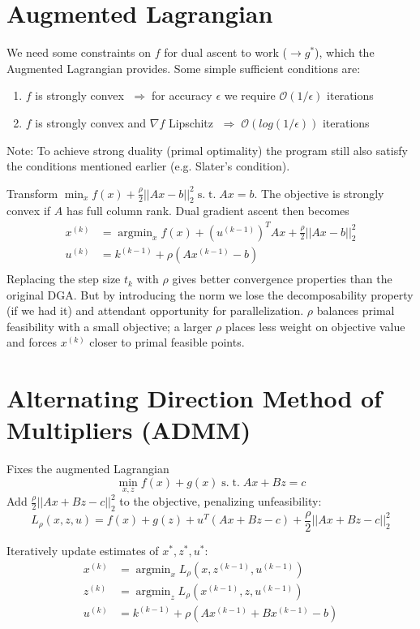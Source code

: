 \documentclass[10pt]{article}
\DeclareMathOperator*{\argmin}{argmin}
\renewcommand{\O}{\ensuremath{\mathcal{O}}}
\newcommand{\st}{\ensuremath{\;\mathrm{s.}\;\mathrm{t.}\;}}
\newcommand{\then}{\ensuremath{\;\Rightarrow\;}}
\begin{document}
\section{Augmented Lagrangian}
We need some constraints on $f$ for dual ascent to work ($\to g^*$), which the Augmented Lagrangian provides.  Some simple sufficient conditions are:
\begin{enumerate}
\item $f$ is strongly convex \then for accuracy $\epsilon$ we require $\O(1/\epsilon)$ iterations
\item $f$ is strongly convex and $\nabla f$ Lipschitz $\then\O(log(1/\epsilon))$ iterations
  \end{enumerate}
    Note: To achieve strong duality (primal optimality) the program still also satisfy the conditions mentioned earlier (e.g. Slater's condition).

    Transform $\min_xf(x)+\frac{\rho}{2}||Ax-b||_2^2 \st Ax=b$.  The objective is strongly convex if $A$ has full column rank.  Dual gradient ascent then becomes
    \begin{align*}
      x^{(k)}&=\argmin_xf(x)+(u^{(k-1)})^TAx+\frac{\rho}{2}||Ax-b||_2^2\\ %
    u^{(k)} &= k^{(k-1)}+\rho(Ax^{(k-1)}-b)\\
    \end{align*}
    Replacing the step size $t_k$ with $\rho$ gives better convergence properties than the original DGA.  But by introducing the norm we lose the decomposability property (if we had it) and  attendant opportunity for parallelization.
$\rho$ balances primal feasibility with a small objective; a larger $\rho$ places less weight on objective value and forces $x^{(k)}$ closer to primal feasible points.
    
\section{Alternating Direction Method of Multipliers (ADMM)}
Fixes the augmented Lagrangian
\[\min_{x,z}f(x)+g(x) \st Ax+Bz=c\]
Add $\frac{\rho}{2}||Ax+Bz-c||_2^2$ to the objective, penalizing unfeasibility:
\[
L_\rho(x,z,u)=f(x)+g(z)+u^T(Ax+Bz-c) + \frac{\rho}{2}||Ax+Bz-c||_2^2
\]

Iteratively update estimates of $x^*,z^*,u^*$:
\begin{align*}
  x^{(k)}&=\argmin_xL_\rho(x,z^{(k-1)},u^{(k-1)})\\
z^{(k)}&=\argmin_zL_\rho(x^{(k-1)},z,u^{(k-1)})\\
u^{(k)} &= k^{(k-1)}+\rho(Ax^{(k-1)}+Bx^{(k-1)}-b)\\
\end{align*}
\end{document}
